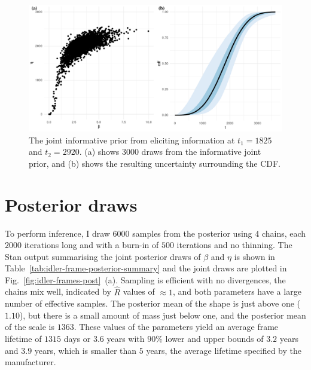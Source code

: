 \begin{figure}
  \centering
  \includegraphics[width=1\textwidth]{./figures/ch-3/idler-frame-prior.pdf}
  \caption{The joint informative prior from eliciting information at $t_1 = 1825$ and $t_2 = 2920$. (a) shows 3000 draws from the informative joint prior, and (b) shows the resulting uncertainty surrounding the CDF.}
  \label{fig:idler-frames-prior}
\end{figure}

\section{Posterior draws} \label{sec:idler-frame-posterior}

To perform inference, I draw $6000$ samples from the posterior using $4$ chains, each $2000$ iterations long and with a burn-in of $500$ iterations and no thinning. The Stan output summarising the joint posterior draws of $\beta$ and $\eta$ is shown in Table~\ref{tab:idler-frame-posterior-summary} and the joint draws are plotted in Fig.~\ref{fig:idler-frames-post}~(a). Sampling is efficient with no divergences, the chains mix well, indicated by $\hat{R}$ values of $\approx 1$, and both parameters have a large number of effective samples. The posterior mean of the shape is just above one ($1.10$), but there is a small amount of mass just below one, and the posterior mean of the scale is $1363$. These values of the parameters yield an average frame lifetime of $1315$ days or $3.6$ years with $90\%$ lower and upper bounds of $3.2$ years and $3.9$ years, which is smaller than $5$ years, the average lifetime  specified by the manufacturer.



